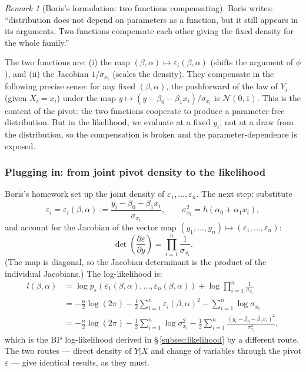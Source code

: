\documentclass[a4paper,oneside,12pt]{extarticle}
\theoremstyle{plain}
\theoremstyle{definition}
\theoremstyle{remark}
\newtheorem{remark}[proposition]{Remark}
\begin{document}
\begin{remark}[Boris's formulation: two functions compensating]
Boris writes: ``distribution does not depend on parameters as a
function, but it still appears in its arguments.  Two functions
compensate each other giving the fixed density for the whole family.''

The two functions are: (i) the map $(\beta,\alpha) \mapsto
\varepsilon_i(\beta,\alpha)$ (shifts the argument of $\phi$), and
(ii) the Jacobian $1/\sigma_{x_i}$ (scales the density).  They
compensate in the following precise sense: for any fixed $(\beta,\alpha)$,
the pushforward of the law of $Y_i$ (given $X_i = x_i$) under the
map $y \mapsto (y-\beta_0-\beta_1 x_i)/\sigma_{x_i}$ is $\mathcal{N}(0,1)$.
This is the content of the pivot: the two functions cooperate to
produce a parameter-free distribution.  But in the likelihood, we
evaluate at a fixed $y_i$, not at a draw from the distribution, so
the compensation is broken and the parameter-dependence is exposed.
\end{remark}

\subsubsection*{Plugging in: from joint pivot density to the likelihood}

Boris's homework set up the joint density of $\varepsilon_1,\ldots,
\varepsilon_n$.  The next step: substitute
\[
  \varepsilon_i = \varepsilon_i(\beta,\alpha)
  := \frac{y_i - \beta_0 - \beta_1 x_i}{\sigma_{x_i}},
  \qquad
  \sigma_{x_i}^2 = h(\alpha_0 + \alpha_1 x_i),
\]
and account for the Jacobian of the vector map
$(y_1,\ldots,y_n) \mapsto (\varepsilon_1,\ldots,\varepsilon_n)$:
\[
  \det\!\left(\frac{\partial\varepsilon}{\partial y}\right)
  = \prod_{i=1}^n \frac{1}{\sigma_{x_i}}.
\]
(The map is diagonal, so the Jacobian determinant is the product of
the individual Jacobians.)  The log-likelihood is:
\begin{align*}
  l(\beta,\alpha)
  &= \log p_\varepsilon\!\left(\varepsilon_1(\beta,\alpha),\ldots,
     \varepsilon_n(\beta,\alpha)\right)
   + \log\prod_{i=1}^n\frac{1}{\sigma_{x_i}} \\[4pt]
  &= -\frac{n}{2}\log(2\pi)
   - \frac{1}{2}\sum_{i=1}^n \varepsilon_i(\beta,\alpha)^2
   - \sum_{i=1}^n \log\sigma_{x_i} \\[4pt]
  &= -\frac{n}{2}\log(2\pi)
   - \frac{1}{2}\sum_{i=1}^n \log\sigma_{x_i}^2
   - \frac{1}{2}\sum_{i=1}^n
     \frac{(y_i - \beta_0 - \beta_1 x_i)^2}{\sigma_{x_i}^2},
\end{align*}
which is the BP log-likelihood derived in §\,\ref{subsec:likelihood}
by a different route.  The two routes — direct density of $Y|X$ and
change of variables through the pivot $\varepsilon$ — give identical
results, as they must.
\end{document}
